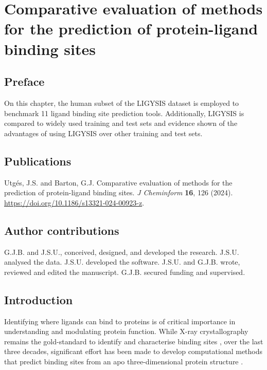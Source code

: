 \chapter{Comparative evaluation of methods for the prediction of protein-ligand binding sites}

\section*{Preface}

On this chapter, the human subset of the LIGYSIS dataset is employed to benchmark 11 ligand binding site prediction tools. Additionally, LIGYSIS is compared to widely used training and test sets and evidence shown of the advantages of using LIGYSIS over other training and test sets.

\section*{Publications}

Utgés, J.S. and Barton, G.J. Comparative evaluation of methods for the prediction of protein-ligand binding sites. \textit{J Cheminform} \textbf{16}, 126 (2024). \url{https://doi.org/10.1186/s13321-024-00923-z}. \cite{UTGES_2024_LBSCOMP}

\section*{Author contributions}

G.J.B. and J.S.U., conceived, designed, and developed the research. J.S.U. analysed the data. J.S.U. developed the software. J.S.U. and G.J.B. wrote, reviewed and edited the manuscript. G.J.B. secured funding and supervised.

\section{Introduction}

Identifying where ligands can bind to proteins is of critical importance in understanding and modulating protein function. While X-ray crystallography remains the gold-standard to identify and characterise binding sites \cite{CONGREVE_2003_RO3, REES_2004_FBLD, MURRAY_2009_FBDD, SCHIEBEL_2016_FRAGMENTS, UTGES_2024_FRAGSYS}, over the last three decades, significant  effort has been made to develop computational methods that predict binding sites from an apo three-dimensional protein structure \cite{VOLKAMER_2010_TOPOLOGY}.

